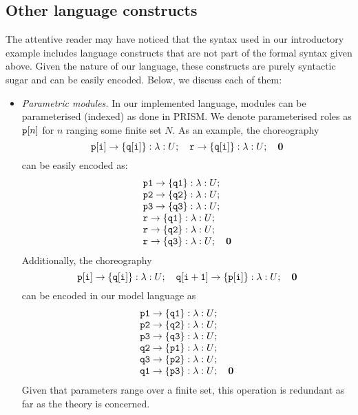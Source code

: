 \subsection{Other language constructs}
%
The attentive reader may have noticed that the syntax used in our
introductory example includes language constructs that are not part of
the formal syntax given above. Given the nature of our language, these
constructs are purely syntactic sugar and can be easily
encoded. Below, we discuss each of them:
% 
\begin{itemize}

\item {\em Parametric modules.} In our implemented language, modules
  can be parameterised (indexed) as done in PRISM. We denote
  parameterised roles as $\mathtt{p}[n]$ for $n$ ranging some finite set
  $N$.
  As an example, the choreography
  \[\mathtt{p[i]}\rightarrow \{\mathtt{q[i]}\}:\lambda:U;\quad 
    \mathtt{r}\rightarrow \{\mathtt{q[i]}\}:\lambda:U;\quad \mathbf{0}
  \]
  can be easily encoded as:
  \[
    \begin{array}{llll}
      \mathtt{p1}\rightarrow \{\mathtt{q1}\}:\lambda:U;\quad \\
      \mathtt{p2}\rightarrow \{\mathtt{q2}\}:\lambda:U;\quad \\
      \mathtt{p3}\rightarrow \{\mathtt{q3}\}:\lambda:U;\quad \\
      \mathtt{r}\rightarrow \{\mathtt{q1}\}:\lambda:U;\quad \\
      \mathtt{r}\rightarrow \{\mathtt{q2}\}:\lambda:U;\quad \\
      \mathtt{r}\rightarrow \{\mathtt{q3}\}:\lambda:U;\quad \mathbf{0}
    \end{array}
  \]
  Additionally, the choreography
  \[\mathtt{p[i]}\rightarrow \{\mathtt{q[i]}\}:\lambda:U;\quad 
    \mathtt{q[i+1]}\rightarrow \{\mathtt{p[i]}\}:\lambda:U;\quad \mathbf{0}
  \]
  can be encoded in our model language as
  \[
    \begin{array}{llll}
      \mathtt{p1}\rightarrow \{\mathtt{q1}\}:\lambda:U;\quad \\
      \mathtt{p2}\rightarrow \{\mathtt{q2}\}:\lambda:U;\quad \\
      \mathtt{p3}\rightarrow \{\mathtt{q3}\}:\lambda:U;\quad \\
      \mathtt{q2}\rightarrow \{\mathtt{p1}\}:\lambda:U;\quad \\
      \mathtt{q3}\rightarrow \{\mathtt{p2}\}:\lambda:U;\quad \\
      \mathtt{q1}\rightarrow \{\mathtt{p3}\}:\lambda:U;\quad  \mathbf{0}
    \end{array}
  \]
  Given that parameters range over a finite set, this operation is
  redundant as far as the theory is concerned.


\end{itemize}
